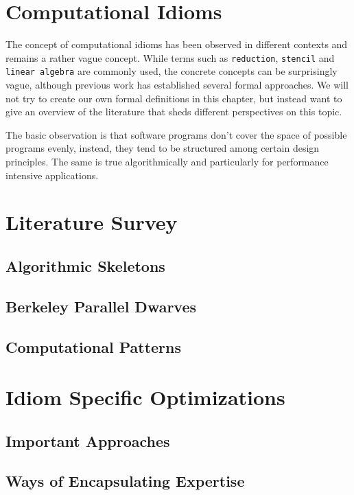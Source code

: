 \section{Computational Idioms}

    The concept of computational idioms has been observed in different contexts
    and remains a rather vague concept.
    While terms such as \texttt{reduction}, \texttt{stencil} and
    \texttt{linear algebra} are commonly used, the concrete concepts can be
    surprisingly vague, although previous work has established several formal
    approaches.
    We will not try to create our own formal definitions in this chapter, but
    instead want to give an overview of the literature that sheds different
    perspectives on this topic.

    The basic observation is that software programs don't cover the space of
    possible programs evenly, instead, they tend to be structured among certain
    design principles.
    The same is true algorithmically and particularly for performance intensive
    applications.

\section{Literature Survey}

\subsection{Algorithmic Skeletons}

\subsection{Berkeley Parallel Dwarves}
\subsection{Computational Patterns}

\section{Idiom Specific Optimizations}

\subsection{Important Approaches}
\subsection{Ways of Encapsulating Expertise}


